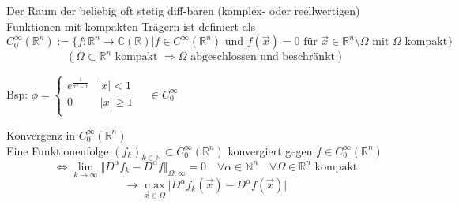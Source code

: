\begin{Def}
    Der Raum der beliebig oft stetig diff-baren (komplex- oder 
    reellwertigen) Funktionen mit kompakten Trägern ist definiert als
    $$C_0^\infty (\mathbb{R}^n)  := \{ f:\mathbb{R}^n \rightarrow \mathbb{C}(\mathbb{R}) | f \in C^\infty(\mathbb{R}^n) \textrm{ und } f(\vec{x})=0 \textrm{ für } \vec{x} \in \mathbb{R}^n \setminus  \Omega \textrm{ mit } \Omega \textrm{ kompakt} \}$$
    $$( \Omega \subset \mathbb{R}^n \textrm{ kompakt } \Rightarrow \Omega \textrm{ abgeschlossen und beschränkt} )$$

    Bsp: $\phi = \left\{ \begin{array}{ll}
        e^{\frac{1}{x^2-1}} & |x| < 1 \\
        0 & \, |x| \geq 1 \\
        \end{array}
        \right. \quad \in C_0^{\infty} $
\end{Def}

\begin{Def}{Konvergenz in $C_0^{\infty}(\mathbb{R}^n)$ \\}
    Eine Funktionenfolge $(f_k)_{k \in \mathbb{N}} \subset C_0^{\infty}(\mathbb{R}^n)$ konvergiert gegen
    $f \in C_0^{\infty}(\mathbb{R}^n)$
    $$\Leftrightarrow \lim_{k\rightarrow \infty} \Vert D^\alpha f_k - D^\alpha f \Vert _{\Omega , \infty} = 0 \quad \forall 
    \alpha \in \mathbb{N}^n \quad \forall \Omega \in \mathbb{R}^n \textrm{ kompakt} $$
    $$ \rightarrow \max_{\vec{x} \in \Omega} \vert D^\alpha f_k(\vec{x}) - D^\alpha f(\vec{x}) \vert$$
\end{Def}














